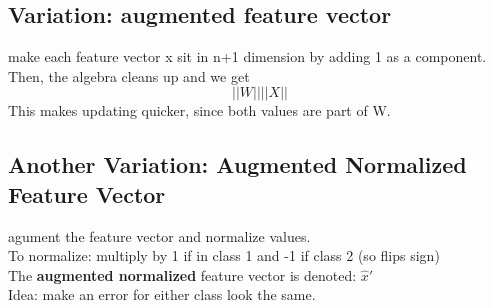 \documentclass[12pt]{article}
\newcommand{\bt}[1]{\textbf{#1}} %
\begin{document}
\subsection*{Variation: augmented feature vector}
make each feature vector x sit in n+1 dimension by adding 1 as a component. Then, the algebra cleans up and we get 
$$||W|| ||X||$$
This makes updating quicker, since both values are part of W.

\subsection*{Another Variation: Augmented Normalized Feature Vector}
agument the feature vector and normalize values.\\

To normalize: multiply by 1 if in class 1 and -1 if class 2 (so flips sign)\\

The \bt{augmented normalized} feature vector is denoted: $\hat{x}'$ \\
Idea: make an error for either class look the same.
\end{document}
